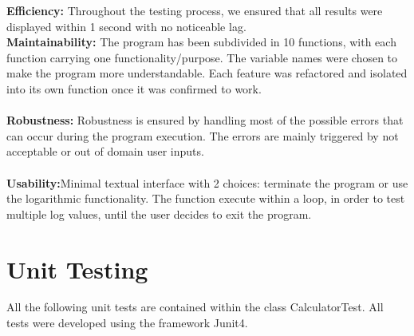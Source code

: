 \documentclass[12pt]{extarticle}
\newcommand{\<}{\langle}
\renewcommand{\>}{\rangle}
\theoremstyle{definition}
\begin{document}
\noindent\textbf{Efficiency:} Throughout the testing process, we ensured that all results were displayed within 1 second with no noticeable lag.\\

\noindent\textbf{Maintainability:} The program has been subdivided in 10 functions, with each function carrying one functionality/purpose. The variable names were chosen to make the program more understandable. Each feature was refactored and isolated into its own function once it was confirmed to work.\\ \\

\noindent\textbf{Robustness:} Robustness is ensured by handling most of the possible errors that can occur during the program execution. The errors are mainly triggered by not acceptable or out of domain user inputs.\\ \\
\noindent\textbf{Usability:}Minimal textual interface with 2 choices: terminate the program or use the logarithmic functionality. The function execute within a loop, in order to test multiple log values, until the user decides to exit the program.\\ 


\section{Unit Testing}
All the following unit tests are contained within the class CalculatorTest. All tests were developed using the framework Junit4.
\end{document}
